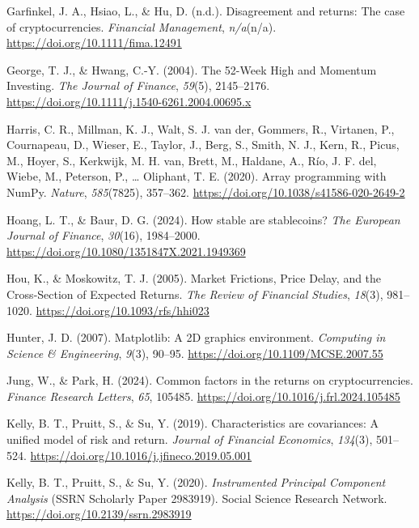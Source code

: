 \documentclass[
  12pt,
  a4paper,
  openany]{scrbook}
\newlength{\cslhangindent}
\newenvironment{CSLReferences}[2] %
 {\begin{list}{}{%
  \setlength{\itemindent}{0pt}
  \setlength{\leftmargin}{0pt}
  \setlength{\parsep}{0pt}
  \ifodd #1
   \setlength{\leftmargin}{\cslhangindent}
   \setlength{\itemindent}{-1\cslhangindent}
  \fi
  \setlength{\itemsep}{#2\baselineskip}}}
 {\end{list}}
\begin{document}
\begin{CSLReferences}{1}{0}
Garfinkel, J. A., Hsiao, L., \& Hu, D. (n.d.). Disagreement and returns:
The case of cryptocurrencies. \emph{Financial Management},
\emph{n/a}(n/a). \url{https://doi.org/10.1111/fima.12491}

George, T. J., \& Hwang, C.-Y. (2004). The 52-Week High and Momentum
Investing. \emph{The Journal of Finance}, \emph{59}(5), 2145--2176.
\url{https://doi.org/10.1111/j.1540-6261.2004.00695.x}

Harris, C. R., Millman, K. J., Walt, S. J. van der, Gommers, R.,
Virtanen, P., Cournapeau, D., Wieser, E., Taylor, J., Berg, S., Smith,
N. J., Kern, R., Picus, M., Hoyer, S., Kerkwijk, M. H. van, Brett, M.,
Haldane, A., Río, J. F. del, Wiebe, M., Peterson, P., \ldots{} Oliphant,
T. E. (2020). Array programming with {NumPy}. \emph{Nature},
\emph{585}(7825), 357--362.
\url{https://doi.org/10.1038/s41586-020-2649-2}

Hoang, L. T., \& Baur, D. G. (2024). How stable are stablecoins?
\emph{The European Journal of Finance}, \emph{30}(16), 1984--2000.
\url{https://doi.org/10.1080/1351847X.2021.1949369}

Hou, K., \& Moskowitz, T. J. (2005). Market Frictions, Price Delay, and
the Cross-Section of Expected Returns. \emph{The Review of Financial
Studies}, \emph{18}(3), 981--1020.
\url{https://doi.org/10.1093/rfs/hhi023}

Hunter, J. D. (2007). Matplotlib: A 2D graphics environment.
\emph{Computing in Science \& Engineering}, \emph{9}(3), 90--95.
\url{https://doi.org/10.1109/MCSE.2007.55}

Jung, W., \& Park, H. (2024). Common factors in the returns on
cryptocurrencies. \emph{Finance Research Letters}, \emph{65}, 105485.
\url{https://doi.org/10.1016/j.frl.2024.105485}

Kelly, B. T., Pruitt, S., \& Su, Y. (2019). Characteristics are
covariances: A unified model of risk and return. \emph{Journal of
Financial Economics}, \emph{134}(3), 501--524.
\url{https://doi.org/10.1016/j.jfineco.2019.05.001}

Kelly, B. T., Pruitt, S., \& Su, Y. (2020). \emph{Instrumented Principal
Component Analysis} (SSRN Scholarly Paper 2983919). Social Science
Research Network. \url{https://doi.org/10.2139/ssrn.2983919}


\end{CSLReferences}
\end{document}
